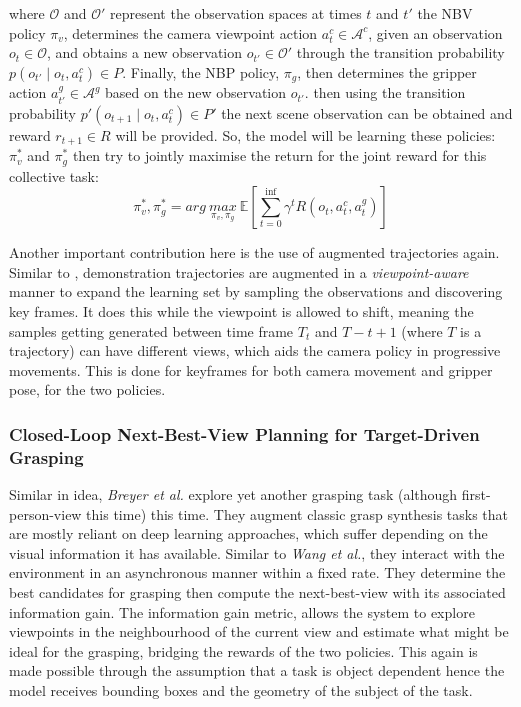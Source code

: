 where $\mathcal{O}$ and $\mathcal{O}'$ represent the observation spaces at times $t$ and $t'$ the NBV policy $\pi_v$, determines the camera viewpoint action $a_t^c \in \mathcal{A}^c$, given an observation $o_t \in \mathcal{O}$, and obtains a new observation $o_{t'} \in \mathcal{O}'$ through the transition probability $p\left(o_{t'} \mid o_t, a_t^c\right) \in P$. Finally, the NBP policy, $\pi_g$, then determines the gripper action $a^g_{t'} \in \mathcal{A}^g$ based on the new observation $o_{t'}$. then using the transition probability $p'\left(o_{t+1} \mid o_t, a^c_t\right) \in P'$ the next scene observation can be obtained and reward $r_{t+1} \in R$ will be provided. So, the model will be learning these policies: $\pi^*_v$ and $\pi^*_g$ then try to jointly maximise the return for the joint reward for this collective task: 
\[
  \pi_v^*, \pi_g^* = 
  arg~\underset{\pi_v, \pi_g}{max} 
  ~\mathbb{E}
  \left[
    \sum_{t=0}^{\inf}{\gamma^t R(o_t, a^c_t, a^g_t)}
  \right]
\]

Another important contribution here is the use of augmented trajectories again. Similar to \cite{papagiannis2024milesmakingimitationlearning}, demonstration trajectories are augmented in a \emph{viewpoint-aware} manner to expand the learning set by sampling the observations and discovering key frames. It does this while the viewpoint is allowed to shift, meaning the samples getting generated between time frame $T_t$ and $T-{t+1}$ (where $T$ is a trajectory) can have different views, which aids the camera policy in progressive movements. This is done for keyframes for both camera movement and gripper pose, for the two policies.

\subsubsection{Closed-Loop Next-Best-View Planning for Target-Driven Grasping}
Similar in idea, \emph{Breyer et al.} explore yet another grasping task (although first-person-view this time) this time. They augment classic grasp synthesis tasks that are mostly reliant on deep learning approaches, which suffer depending on the visual information it has available. Similar to \emph{Wang et al.}, they interact with the environment in an asynchronous manner within a fixed rate. They determine the best candidates for grasping then compute the next-best-view with its associated information gain. 
The information gain metric, allows the system to explore viewpoints in the neighbourhood of the current view and estimate what might be ideal for the grasping, bridging the rewards of the two policies. This again is made possible through the assumption that a task is object dependent hence the model receives bounding boxes and the geometry of the subject of the task.

